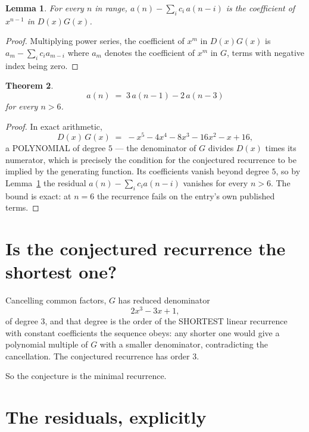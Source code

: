 \documentclass[11pt,a4paper]{article}
\theoremstyle{plain}
\newtheorem{theorem}{Theorem}
\newtheorem{lemma}[theorem]{Lemma}
\theoremstyle{definition}
\begin{document}
\begin{lemma}\label{lem:key}
For every $n$ in range, $a(n)-\sum_i c_i\,a(n-i)$ is the coefficient of $x^{n-1}$ in
$D(x)G(x)$.
\end{lemma}

\begin{proof}
Multiplying power series, the coefficient of $x^{m}$ in $D(x)G(x)$ is
$a_m-\sum_i c_i a_{m-i}$ where $a_m$ denotes the coefficient of $x^{m}$ in $G$, terms with
negative index being zero.
\end{proof}

\begin{theorem}
\[
a(n)\;=\;3\,a(n-1) - 2\,a(n-3)
\]
for every $n>6$.
\end{theorem}

\begin{proof}
In exact arithmetic,
\[
D(x)\,G(x)\;=\;- x^{5} - 4 x^{4} - 8 x^{3} - 16 x^{2} - x + 16,
\]
a POLYNOMIAL of degree $5$ --- the denominator of $G$ divides $D(x)$ times its numerator,
which is precisely the condition for the conjectured recurrence to be implied by the
generating function. Its coefficients vanish beyond degree $5$, so by
Lemma~\ref{lem:key} the residual $a(n)-\sum_ic_ia(n-i)$ vanishes for every
$n>6$. The bound is exact: at $n=6$ the recurrence fails on the entry's own published terms.
\end{proof}

\section{Is the conjectured recurrence the shortest one?}

Cancelling common factors, $G$ has reduced denominator
\[
2 x^{3} - 3 x + 1,
\]
of degree $3$, and that degree is the order of the SHORTEST linear recurrence with
constant coefficients the sequence obeys: any shorter one would give a polynomial multiple of
$G$ with a smaller denominator, contradicting the cancellation. The conjectured recurrence has
order $3$.

So the conjecture is the minimal recurrence.

\section{The residuals, explicitly}
\end{document}
